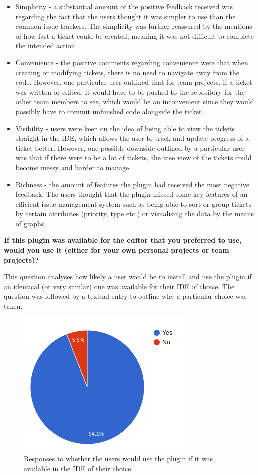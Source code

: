 \documentclass{4thYearProject}
\begin{document}
\begin{itemize}
\item Simplicity - a substantial amount of the positive feedback received was regarding the fact that the users thought it was simpler to use than the common issue trackers. The simplicity was further reassured by the mentions of how fast a ticket could be created, meaning it was not difficult to complete the intended action.
\item Convenience - the positive comments regarding convenience were that when creating or modifying tickets, there is no need to navigate away from the code. However, one particular user outlined that for team projects, if a ticket was written or edited, it would have to be pushed to the repository for the other team members to see, which would be an inconvenient since they would possibly have to commit unfinished code alongside the ticket.
\item Visibility - users were keen on the idea of being able to view the tickets straight in the IDE, which allows the user to track and update progress of a ticket better. However, one possible downside outlined by a particular user was that if there were to be a lot of tickets, the tree view of the tickets could become messy and harder to manage.  
\item Richness - the amount of features the plugin had received the most negative feedback. The users thought that the plugin missed some key features of an efficient issue management system such as being able to sort or group tickets by certain attributes (priority, type etc.) or visualising the data by the means of graphs. 
\end{itemize}

\textbf{If this plugin was available for the editor that you preferred to use, would you use it (either for your own personal projects or team projects)?}

This question analyses how likely a user would be to install and use the plugin if an identical (or very similar) one was available for their IDE of choice. The question was followed by a textual entry to outline why a particular choice was taken. 

\begin{figure}[H]
\includegraphics[scale=0.6]{Would_you_use}
\centering
\caption{Responses to whether the users would use the plugin if it was available in the IDE of their choice.}
\label{fig:wouldyouuse}
\end{figure}
\end{document}
